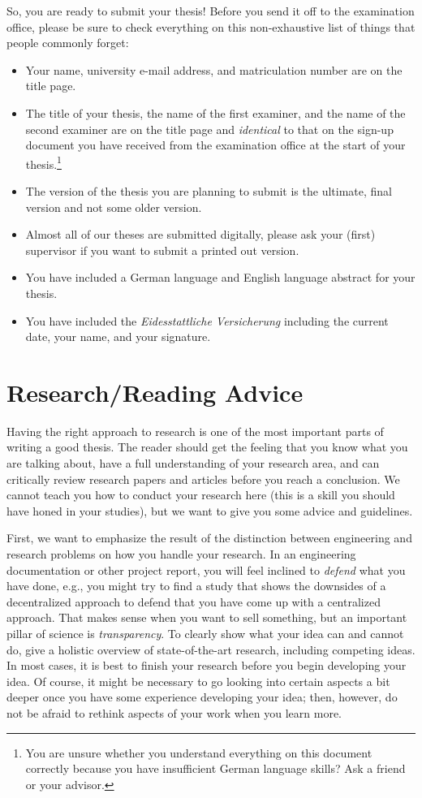 \documentclass[a4paper]{article}
\begin{document}
So, you are ready to submit your thesis!
Before you send it off to the examination office, please be sure to check everything on this non-exhaustive list of things that people commonly forget:

\begin{itemize}
    \item Your name, university e-mail address, and matriculation number are on the title page.
    \item The title of your thesis, the name of the first examiner, and the name of the second examiner are on the title page and \emph{identical} to that on the sign-up document you have received from the examination office at the start of your thesis.\footnote{You are unsure whether you understand everything on this document correctly because you have insufficient German language skills? Ask a friend or your advisor.}
    \item The version of the thesis you are planning to submit is the ultimate, final version and not some older version.
    \item Almost all of our theses are submitted digitally, please ask your (first) supervisor if you want to submit a printed out version.
    \item You have included a German language and English language abstract for your thesis.
    \item You have included the \emph{Eidesstattliche Versicherung} including the current date, your name, and your signature.
\end{itemize}

\section{Research/Reading Advice}
\label{sec:research}

Having the right approach to research is one of the most important parts of writing a good thesis.
The reader should get the feeling that you know what you are talking about, have a full understanding of your research area, and can critically review research papers and articles before you reach a conclusion.
We cannot teach you how to conduct your research here (this is a skill you should have honed in your studies), but we want to give you some advice and guidelines.

First, we want to emphasize the result of the distinction between engineering and research problems on how you handle your research.
In an engineering documentation or other project report, you will feel inclined to \emph{defend} what you have done, e.g., you might try to find a study that shows the downsides of a decentralized approach to defend that you have come up with a centralized approach.
That makes sense when you want to sell something, but an important pillar of science is \emph{transparency}.
To clearly show what your idea can and cannot do, give a holistic overview of state-of-the-art research, including competing ideas.
In most cases, it is best to finish your research before you begin developing your idea.
Of course, it might be necessary to go looking into certain aspects a bit deeper once you have some experience developing your idea; then, however, do not be afraid to rethink aspects of your work when you learn more.
\end{document}
